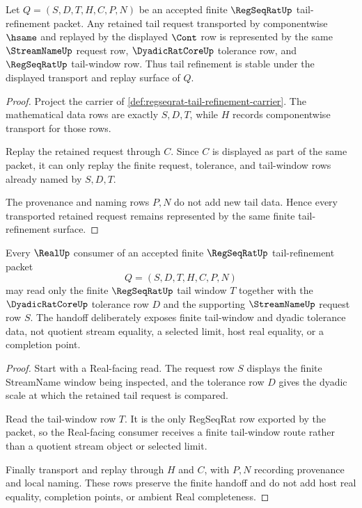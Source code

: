 \begin{theorem}
\label{thm:regseqrat-tail-refinement-stability}
Let $Q=(S,D,T,H,C,P,N)$ be an accepted finite $\RegSeqRatUp$ tail-refinement packet. Any retained tail request transported by componentwise $\hsame$ and replayed by the displayed $\Cont$ row is represented by the same $\StreamNameUp$ request row, $\DyadicRatCoreUp$ tolerance row, and $\RegSeqRatUp$ tail-window row. Thus tail refinement is stable under the displayed transport and replay surface of $Q$.
\end{theorem}
\begin{proof}
Project the carrier of \autoref{def:regseqrat-tail-refinement-carrier}. The mathematical data rows are exactly $S,D,T$, while $H$ records componentwise transport for those rows.

Replay the retained request through $C$. Since $C$ is displayed as part of the same packet, it can only replay the finite request, tolerance, and tail-window rows already named by $S,D,T$.

The provenance and naming rows $P,N$ do not add new tail data. Hence every transported retained request remains represented by the same finite tail-refinement surface.
\end{proof}

\begin{theorem}
\label{thm:regseqrat-tail-refinement-real-handoff}
Every $\RealUp$ consumer of an accepted finite $\RegSeqRatUp$ tail-refinement packet
$$
Q=(S,D,T,H,C,P,N)
$$
may read only the finite $\RegSeqRatUp$ tail window $T$ together with the $\DyadicRatCoreUp$ tolerance row $D$ and the supporting $\StreamNameUp$ request row $S$. The handoff deliberately exposes finite tail-window and dyadic tolerance data, not quotient stream equality, a selected limit, host real equality, or a completion point.
\end{theorem}
\begin{proof}
Start with a Real-facing read. The request row $S$ displays the finite StreamName window being inspected, and the tolerance row $D$ gives the dyadic scale at which the retained tail request is compared.

Read the tail-window row $T$. It is the only RegSeqRat row exported by the packet, so the Real-facing consumer receives a finite tail-window route rather than a quotient stream object or selected limit.

Finally transport and replay through $H$ and $C$, with $P,N$ recording provenance and local naming. These rows preserve the finite handoff and do not add host real equality, completion points, or ambient Real completeness.
\end{proof}

